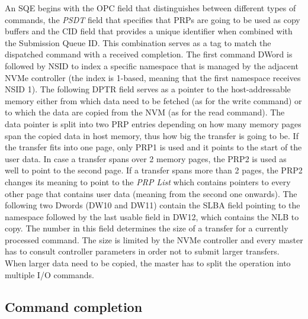 An \ac{SQE} begins with the \ac{OPC} field that distinguishes between different types of commands,
the \emph{PSDT} field that specifies that \acp{PRP} are going to be used as copy buffers and the
\ac{CID} field that provides a unique identifier when combined with the Submission Queue ID. This
combination serves as a tag to match the dispatched command with a received completion. The first
command DWord is followed by \ac{NSID} to index a specific namespace that is managed by the adjacent
NVMe controller (the index is 1-based, meaning that the first namespace receives NSID 1).  The
following \ac{DPTR} field serves as a pointer to the host-addressable memory either from which data
need to be fetched (as for the write command) or to which the data are copied from the \ac{NVM} (as
for the read command). The data pointer is split into two \ac{PRP} entries depending on how many
memory pages span the copied data in host memory, thus how big the transfer is going to be. If
the transfer fits into one page, only \ac{PRP1} is used and it points to the start of the user data.
In case a transfer spans over 2 memory pages, the \ac{PRP2} is used as well to point to the second
page. If a transfer spans more than 2 pages, the \ac{PRP2} changes its meaning to point to the
\emph{PRP List} which contains pointers to every other page that contains user data (meaning
from the second one onwards). The following two Dwords (DW10 and DW11) contain the \ac{SLBA} field
pointing to the namespace followed by the last usable field in DW12, which contains the \ac{NLB} to copy.
The number in this field determines the size of a transfer for a currently processed command. The
size is limited by the NVMe controller and every master has to consult controller parameters in
order not to submit larger transfers. When larger data need to be copied, the master has to split
the operation into multiple I/O commands\cite{nvme_spec}.

\subsection{Command completion}

